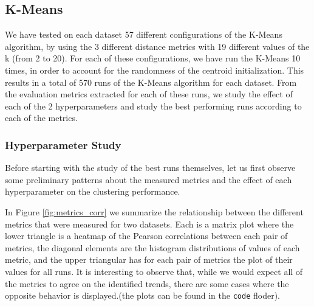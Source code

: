 \subsection{K-Means}
We have tested on each dataset 57 different configurations of the K-Means algorithm, by using the 3 different distance metrics with 19 different values of the k (from 2 to 20). For each of these configurations, we have run the K-Means 10 times, in order to account for the randomness of the centroid initialization. This results in a total of 570 runs of the K-Means algorithm for each dataset. From the evaluation metrics extracted for each of these runs, we study the effect of each of the 2 hyperparameters and study the best performing runs according to each of the metrics.

\subsubsection{Hyperparameter Study}
Before starting with the study of the best runs themselves, let us first observe some preliminary patterns about the measured metrics and the effect of each hyperparameter on the clustering performance.

In Figure \ref{fig:metrics_corr} we summarize the relationship between the different metrics that were measured for two datasets. Each is a matrix plot where the lower triangle is a heatmap of the Pearson correlations between each pair of metrics, the diagonal elements are the histogram distributions of values of each metric, and the upper triangular has for each pair of metrics the plot of their values for all runs. It is interesting to observe that, while we would expect all of the metrics to agree on the identified trends, there are some cases where the opposite behavior is displayed.(the plots can be found in the \texttt{code} floder).

